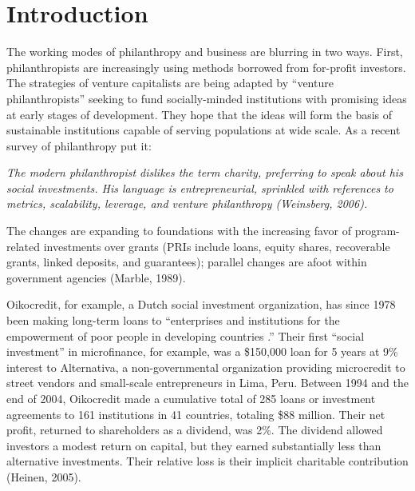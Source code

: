 \documentclass{article} %
\begin{document}
\textbf{ }





\noindent 
\section{Introduction}

The working modes of philanthropy and business are blurring in two ways. First, philanthropists are increasingly using methods borrowed from for-profit investors. The strategies of venture capitalists are being adapted by ``venture philanthropists'' seeking to fund socially-minded institutions with promising ideas at early stages of development. They hope that the ideas will form the basis of sustainable institutions capable of serving populations at wide scale. As a recent survey of philanthropy put it: 

\noindent \textit{The modern philanthropist dislikes the term charity, preferring to speak about his social investments. His language is entrepreneurial, sprinkled with references to metrics, scalability, leverage, and venture philanthropy (Weinsberg, 2006).  }

The changes are expanding to foundations with the increasing favor of program-related investments over grants (PRIs include loans, equity shares, recoverable grants, linked deposits, and guarantees); parallel changes are afoot within government agencies (Marble, 1989). 

Oikocredit, for example, a Dutch social investment organization, has since 1978 been making long-term loans to ``enterprises and institutions for the empowerment of poor people in developing countries .'' Their first ``social investment'' in microfinance, for example, was a \$150,000 loan for 5 years at 9\% interest to Alternativa, a non-governmental organization providing microcredit to street vendors and small-scale entrepreneurs in Lima, Peru. Between 1994 and the end of 2004, Oikocredit made a cumulative total of 285 loans or investment agreements to 161 institutions in 41 countries, totaling \$88 million. Their net profit, returned to shareholders as a dividend, was 2\%. The dividend allowed investors a modest return on capital, but they earned substantially less than alternative investments. Their relative loss is their implicit charitable contribution (Heinen, 2005). 
\end{document}
